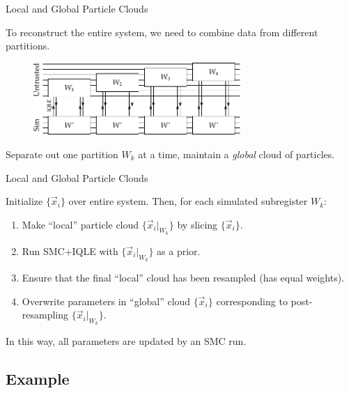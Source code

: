 \documentclass[xcolor=dvipsnames, compress]{beamer}
\newcommand{\ee}{\mathrm{e}}
\begin{document}
\begin{frame}{Local and Global Particle Clouds}
  
  To reconstruct the entire system, we need to combine data from different partitions.
  
  \begin{figure}
    \centering
    \includegraphics[width=0.7\textwidth]{global-chain}
  \end{figure}

  Separate out one partition $W_k$ at a time, maintain a \emph{global} cloud of particles. 
  
\end{frame}

\begin{frame}{Local and Global Particle Clouds}

  Initialize $\{\vec{x}_i\}$ over entire system. Then, for each simulated subregister $W_k$:
  \begin{enumerate}
    \item Make ``local'' particle cloud $\{\vec{x}_i|_{W_k}\}$ by slicing $\{\vec{x}_i\}$.
    \item Run SMC+IQLE with $\{\vec{x}_i|_{W_k}\}$ as a prior.
    \item Ensure that the final ``local'' cloud has been resampled (has equal weights).
    \item Overwrite parameters in ``global'' cloud $\{\vec{x}_i\}$ corresponding
      to post-resampling $\{\vec{x}_i|_{W_k}\}$.
  \end{enumerate}

  In this way, all parameters are updated by an SMC run.

\end{frame}

\subsection{Example}

\end{document}
